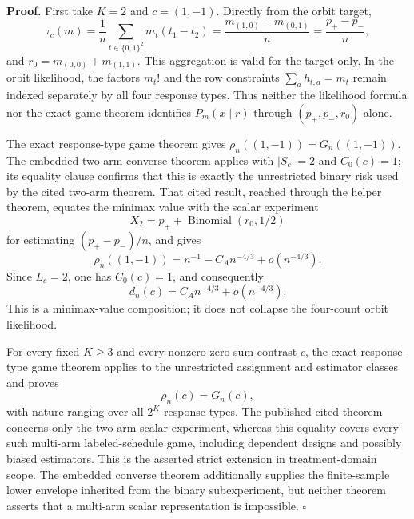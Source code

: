\textbf{Proof.}
First take \(K=2\) and \(c=(1,-1)\). Directly from the orbit target,
\[
 \tau_c(m)=\frac1n\sum_{t\in\{0,1\}^2}m_t(t_1-t_2)
 =\frac{m_{(1,0)}-m_{(0,1)}}n
 =\frac{p_+-p_-}{n},
\]
and \(r_0=m_{(0,0)}+m_{(1,1)}\). This aggregation is valid for the target only. In the orbit likelihood, the factors \(m_t!\) and the row constraints \(\sum_a h_{t,a}=m_t\) remain indexed separately by all four response types. Thus neither the likelihood formula nor the exact-game theorem identifies \(P_m(x\mid r)\) through \((p_+,p_-,r_0)\) alone.

The exact response-type game theorem gives \(\rho_n((1,-1))=G_n((1,-1))\). The embedded two-arm converse theorem applies with \(|S_c|=2\) and \(C_0(c)=1\); its equality clause confirms that this is exactly the unrestricted binary risk used by the cited two-arm theorem. That cited result, reached through the helper theorem, equates the minimax value with the scalar experiment
\[
 X_2=p_++\operatorname{Binomial}(r_0,1/2)
\]
for estimating \((p_+-p_-)/n\), and gives
\[
 \rho_n((1,-1))=n^{-1}-C_A n^{-4/3}+o(n^{-4/3}).
\]
Since \(L_c=2\), one has \(C_0(c)=1\), and consequently
\[
 d_n(c)=C_A n^{-4/3}+o(n^{-4/3}).
\]
This is a minimax-value composition; it does not collapse the four-count orbit likelihood.

For every fixed \(K\geq3\) and every nonzero zero-sum contrast \(c\), the exact response-type game theorem applies to the unrestricted assignment and estimator classes and proves
\[
 \rho_n(c)=G_n(c),
\]
with nature ranging over all \(2^K\) response types. The published cited theorem concerns only the two-arm scalar experiment, whereas this equality covers every such multi-arm labeled-schedule game, including dependent designs and possibly biased estimators. This is the asserted strict extension in treatment-domain scope. The embedded converse theorem additionally supplies the finite-sample lower envelope inherited from the binary subexperiment, but neither theorem asserts that a multi-arm scalar representation is impossible. \(\square\)